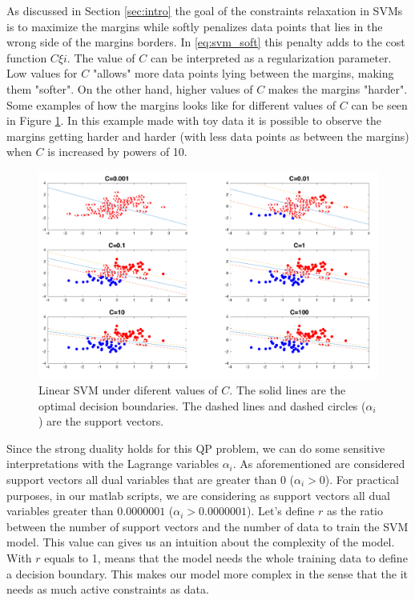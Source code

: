 \label{sec:complexity}

As discussed in Section \ref{sec:intro} the goal of the constraints relaxation in SVMs is to maximize the margins while softly penalizes data points that lies in the wrong side of the margins borders.
In \ref{eq:svm_soft} this penalty adds to the cost function $C\xi{i}$.
The value of $C$ can be interpreted as a regularization parameter.
Low values for $C$ "allows" more data points lying between the margins, making them "softer".
On the other hand, higher values of $C$ makes the margins "harder".
Some examples of how the margins looks like for different values of $C$ can be seen in Figure \ref{fig:svm}.
In this example made with toy data it is possible to observe the margins getting harder and harder (with less data points as between the margins) when $C$ is increased by powers of 10.

\begin{figure}[!htb]
\begin{center}
\includegraphics [width=12.5cm] {./graphics/SVM_PLOT.png}
\caption{Linear SVM under diferent values of $C$. The solid lines are the optimal decision boundaries. The dashed lines and dashed circles ($\alpha_{i}$) are the support vectors.} \label{fig:svm}
\end{center}
\end{figure}


Since the strong duality holds for this QP problem, we can do some sensitive interpretations with the Lagrange variables $\alpha_{i}$.
As aforementioned are considered support vectors all dual variables that are greater than 0 ($\alpha_{i} > 0$).
For practical purposes, in our matlab scripts, we are considering as support vectors all dual variables greater than $0.0000001$ ($ \alpha_{i} > 0.0000001$).
Let's define $r$ as the ratio between the number of support vectors and the number of data to train the SVM model.
This value can gives us an intuition about the complexity of the model.
With $r$ equals to 1, means that the model needs the whole training data to define a decision boundary.
This makes our model more complex in the sense that the it needs as much active constraints as data.

